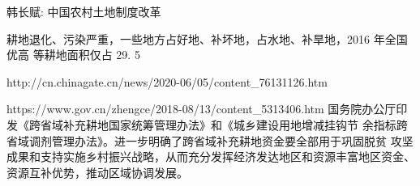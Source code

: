 %


韩长赋: 中国农村土地制度改革

耕地退化、污染严重，一些地方占好地、补坏地，占水地、补旱地，2016 年全国优高
等耕地面积仅占 29. 5%


http://cn.chinagate.cn/news/2020-06/05/content_76131126.htm

https://www.gov.cn/zhengce/2018-08/13/content_5313406.htm
国务院办公厅印发《跨省域补充耕地国家统筹管理办法》和《城乡建设用地增减挂钩节
余指标跨省域调剂管理办法》。进一步明确了跨省域补充耕地资金要全部用于巩固脱贫
攻坚成果和支持实施乡村振兴战略，从而充分发挥经济发达地区和资源丰富地区资金、
资源互补优势，推动区域协调发展。
